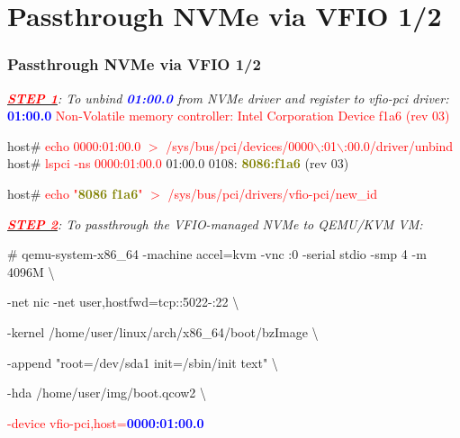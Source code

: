 \documentclass[aspectratio=169]{beamer}
\begin{document}
\section{Passthrough NVMe via VFIO 1/2}
\begin{frame}
\frametitle{Passthrough NVMe via VFIO 1/2}
\begin{block}{}
\textit{\underline{\textbf{\textcolor{red}{STEP 1}}}: To unbind \textbf{\textcolor{blue}{01:00.0}} from NVMe driver and register to vfio-pci driver:} \newline
{\small \textcolor{red}{\textbf{\textcolor{blue}{01:00.0}} Non-Volatile memory controller: Intel Corporation Device f1a6 (rev 03)}}

\vspace{2 mm}

host\# \textcolor{red}{echo 0000:01:00.0 $>$ /sys/bus/pci/devices/0000$\backslash$:01$\backslash$:00.0/driver/unbind} \newline
host\# \textcolor{red}{lspci -ns 0000:01:00.0} \newline
{\small 01:00.0 0108: \textbf{\textcolor{olive}{8086:f1a6}} (rev 03)}

\vspace{1 mm}

host\# \textcolor{red}{echo "\textbf{\textcolor{olive}{8086 f1a6}}" $>$ /sys/bus/pci/drivers/vfio-pci/new\_id}
\end{block}
\begin{block}{}
\textit{\underline{\textbf{\textcolor{red}{STEP 2}}}: To passthrough the VFIO-managed NVMe to QEMU/KVM VM:}

\vspace{2 mm}

{\small
\# qemu-system-x86\_64 -machine accel=kvm -vnc :0 -serial stdio -smp 4 -m 4096M \textbackslash

-net nic -net user,hostfwd=tcp::5022-:22 \textbackslash

-kernel /home/user/linux/arch/x86\_64/boot/bzImage \textbackslash
	
-append "root=/dev/sda1 init=/sbin/init text" \textbackslash

-hda /home/user/img/boot.qcow2 \textbackslash
}

\textcolor{red}{-device vfio-pci,host=\textbf{\textcolor{blue}{0000:01:00.0}}}
\end{block}
\end{frame}

\end{document}
